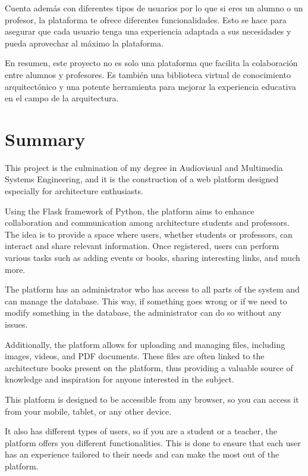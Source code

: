 \documentclass[a4paper, 12pt]{book}
\begin{document}
Cuenta además con diferentes tipos de usuarios por lo que si eres un alumno o un profesor, la plataforma te ofrece diferentes funcionalidades. 
Esto se hace para asegurar que cada usuario tenga una experiencia adaptada a sus necesidades y pueda aprovechar al máximo la plataforma.

En resumen, este proyecto no es solo una plataforma que facilita la colaboración entre alumnos y profesores. Es también 
una biblioteca virtual de conocimiento arquitectónico y una potente herramienta para mejorar la experiencia educativa en el 
campo de la arquitectura.


\chapter*{Summary}

This project is the culmination of my degree in Audiovisual and Multimedia Systems Engineering, and it is the construction of a web 
platform designed especially for architecture enthusiasts.

Using the Flask framework of Python, the platform aims to enhance collaboration and communication among architecture students and 
professors. The idea is to provide a space where users, whether students or professors, can interact and share relevant information. 
Once registered, users can perform various tasks such as adding events or books, sharing interesting links, and much more.

The platform has an administrator who has access to all parts of the system and can manage the database. This way, if something goes 
wrong or if we need to modify something in the database, the administrator can do so without any issues.

Additionally, the platform allows for uploading and managing files, including images, videos, and PDF documents. These files are often 
linked to the architecture books present on the platform, thus providing a valuable source of knowledge and inspiration for anyone 
interested in the subject.

This platform is designed to be accessible from any browser, so you can access it from your mobile, tablet, or any other device.

It also has different types of users, so if you are a student or a teacher, the platform offers you different functionalities. This 
is done to ensure that each user has an experience tailored to their needs and can make the most out of the platform.
\end{document}
